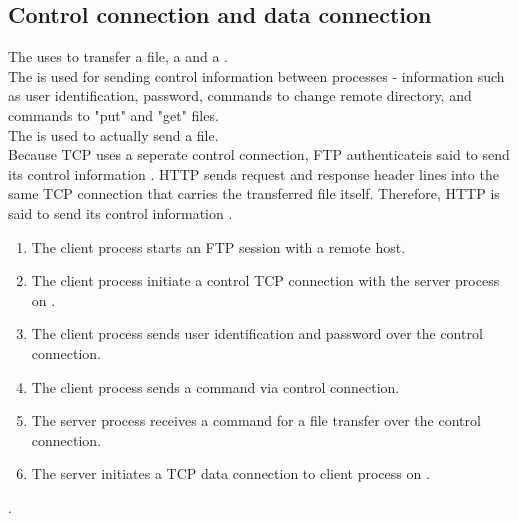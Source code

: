\subsection{Control connection and data connection}

\hf
The  uses  to transfer a file, a
 and a .\\

The  is used for sending control information between processes -
information such as user identification, password, commands to change remote directory,
and commands to "put" and "get" files.\\

The  is used to actually send a file.\\
Because TCP uses a seperate control connection, FTP authenticateis said to send its control information
. HTTP sends request and response header lines into the same TCP connection that
carries the transferred file itself. Therefore, HTTP is said to send its control information .


\begin{enumerate}
    \item The client process starts an FTP session with a remote host.
    \item The client process initiate a control TCP connection with the server process on .
    \item The client process sends user identification and password over the control connection.
    \item The client process sends a command via control connection.
    \item The server process receives a command for a file transfer over the control connection.
    \item The server initiates a TCP data connection to client process on .
\end{enumerate}



.

